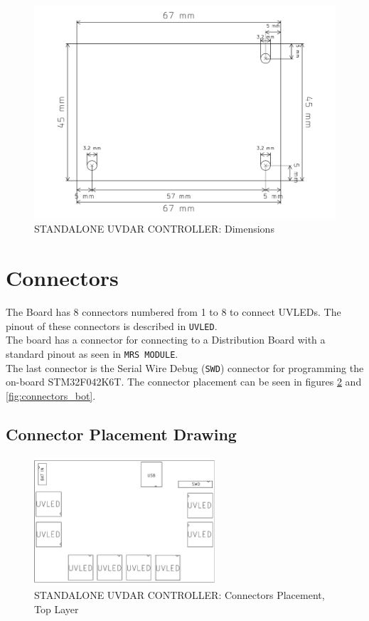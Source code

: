 \documentclass[12pt, a4paper]{article}
\begin{document}
\begin{figure}[h]
\centering
\includegraphics[width=\textwidth]{figures/Dimensions.pdf}
\caption{STANDALONE UVDAR CONTROLLER: Dimensions}
\label{fig:dimensions}
\end{figure}

\pagebreak
\section{Connectors}
The Board has 8 connectors numbered from 1 to 8 to connect UVLEDs. The pinout of these connectors is described in \verb|UVLED|.\\
The board has a connector for connecting to a Distribution Board with a standard pinout as seen in \verb|MRS MODULE|.\\
The last connector is the Serial Wire Debug (\verb|SWD|) connector for programming the on-board STM32F042K6T.
The connector placement can be seen in figures \ref{fig:connectors_top} and \ref{fig:connectors_bot}.
\subsection{Connector Placement Drawing}
\begin{figure}[h]
\centering
\includegraphics[clip=true,width=0.6\textwidth]{figures/Connectors_top.pdf}
\caption{STANDALONE UVDAR CONTROLLER: Connectors Placement, Top Layer}
\label{fig:connectors_top}
\end{figure}
\end{document}
